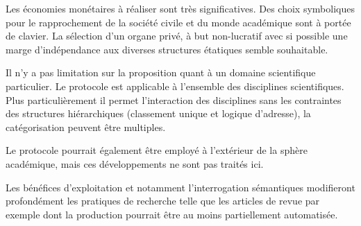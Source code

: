 Les économies monétaires à réaliser sont très significatives.
Des choix symboliques pour le rapprochement de la société civile et du monde académique sont à portée de clavier.
La sélection d'un organe privé, à but non-lucratif avec si possible une marge d'indépendance aux diverses structures étatiques semble souhaitable.

Il n'y a pas limitation sur la proposition quant à un domaine scientifique particulier.
Le protocole est applicable à l'ensemble des disciplines scientifiques.
Plus particulièrement il permet l'interaction des disciplines sans les contraintes des structures hiérarchiques (classement unique et logique d'adresse), la catégorisation peuvent être multiples.

Le protocole pourrait également être employé à l'extérieur de la sphère académique, mais ces développements ne sont pas traités ici.

Les bénéfices d'exploitation et notamment l'interrogation sémantiques modifieront profondément les pratiques de recherche telle que les articles de revue par exemple dont la production pourrait être au moins partiellement automatisée.


